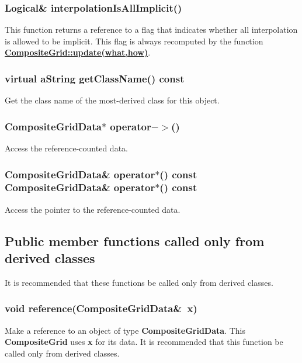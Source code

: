 \documentclass{article}
\begin{document}
  \subsubsection{Logical\& interpolationIsAllImplicit()}
  \label{CompositeGrid::interpolationIsAllImplicit() const}
    This function returns a reference to a flag that indicates whether all interpolation is allowed to be implicit.
    This flag is always recomputed by the function
    {\bf{}\hyperref{update(what,how)}{update(what,how) \rm(\S}{)}{CompositeGrid::update(what,how)}}.

  \subsubsection{virtual aString getClassName() const}
  \label{CompositeGrid::getClassName() const}
    Get the class name of the most-derived class for this object.

  \subsubsection{CompositeGridData$*$ operator${-}{>}$()}
  \label{CompositeGrid::operator->()}
    Access the reference-counted data.

  \subsubsection[CompositeGridData\& operator$*$()]
  {CompositeGridData\& operator$*$()\hfill\break
  const CompositeGridData\& operator$*$() const}
  \label{CompositeGrid::operator*()}
    Access the pointer to the reference-counted data.

\subsection{Public member functions called only from derived classes}
\label{CompositeGrid::PublicDerivedClassMemberFunctions}

It is recommended that these functions be called only from derived classes.

  \subsubsection{void reference(CompositeGridData\&~x)}
  \label{CompositeGrid::reference(CompositeGridData_x)}
    Make a reference to an object of type \textbf{CompositeGridData}.
    This \textbf{CompositeGrid} uses \textbf{x} for its data.
    It is recommended that this function be called only from derived classes.
\end{document}
